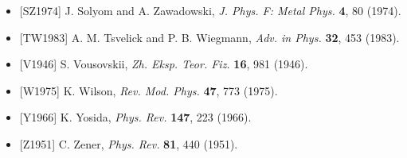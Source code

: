 \begin{itemize}[leftmargin=2em,itemsep=0pt,parsep=0pt,label={}]
\item {[SZ1974]} J. Solyom and A. Zawadowski, \emph{J. Phys. F: Metal Phys.} \textbf{4}, 80 (1974).
\item {[TW1983]} A. M. Tsvelick and P. B. Wiegmann, \emph{Adv. in Phys.} \textbf{32}, 453 (1983).
\item {[V1946]} S. Vousovskii, \emph{Zh. Eksp. Teor. Fiz.} \textbf{16}, 981 (1946).
\item {[W1975]} K. Wilson, \emph{Rev. Mod. Phys.} \textbf{47}, 773 (1975).
\item {[Y1966]} K. Yosida, \emph{Phys. Rev.} \textbf{147}, 223 (1966).
\item {[Z1951]} C. Zener, \emph{Phys. Rev.} \textbf{81}, 440 (1951).
\end{itemize}
